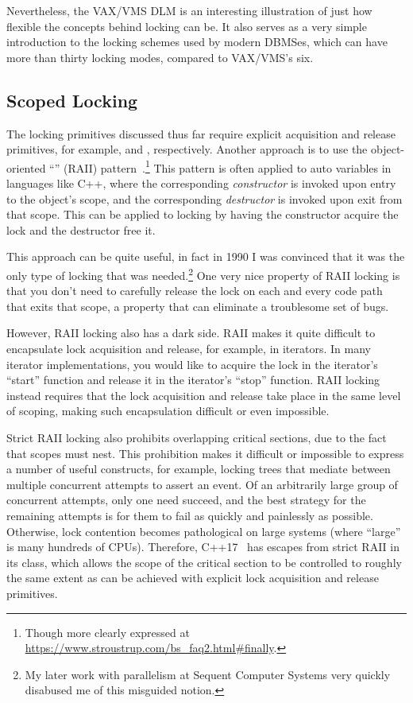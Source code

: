 Nevertheless, the VAX/VMS DLM is an interesting illustration of just
how flexible the concepts behind locking can be.
It also serves as a very simple introduction to the locking schemes
used by modern DBMSes, which can have more than thirty locking modes,
compared to VAX/VMS's six.

\subsection{Scoped Locking}
\label{sec:locking:Scoped Locking}

The locking primitives discussed thus far require explicit acquisition and
release primitives, for example,  and ,
respectively.
Another approach is to use the object-oriented ``'' (RAII)
pattern~\cite{MargaretAEllis1990Cplusplus}.\footnote{
	Though more clearly expressed at
	\url{https://www.stroustrup.com/bs_faq2.html\#finally}.}
This pattern is often applied to auto variables in languages like C++,
where the corresponding \emph{constructor} is invoked upon entry to
the object's scope, and the corresponding \emph{destructor} is invoked
upon exit from that scope.
This can be applied to locking by having the constructor acquire the
lock and the destructor free it.

This approach can be quite useful, in fact in 1990 I was convinced that it
was the only type of locking that was needed.\footnote{
	My later work with parallelism at Sequent Computer Systems very
	quickly disabused me of this misguided notion.}
One very nice property of RAII locking is that you don't need to carefully
release the lock on each and every code path that exits that scope,
a property that can eliminate a troublesome set of bugs.

However, RAII locking also has a dark side.
RAII makes it quite difficult to encapsulate lock acquisition and release,
for example, in iterators.
In many iterator implementations, you would like to acquire the lock in
the iterator's ``start'' function and release it in the iterator's ``stop''
function.
RAII locking instead requires that the lock acquisition and release take
place in the same level of scoping, making such encapsulation difficult or
even impossible.

Strict RAII locking also prohibits overlapping critical sections, due
to the fact that scopes must nest.
This prohibition makes it difficult or impossible to express a number of
useful constructs, for example, locking trees
that mediate between multiple concurrent attempts to assert an event.
Of an arbitrarily large group of concurrent attempts, only one need succeed,
and the best strategy for the remaining attempts is for them to fail as
quickly and painlessly as possible.
Otherwise, lock contention becomes pathological on large systems
(where ``large'' is many hundreds of CPUs).
Therefore, C++17~\cite{RichardSmith2019N4800} has escapes from strict RAII
in its  class, which allows the scope of the critical
section to be controlled to roughly the same extent as can be achieved
with explicit lock acquisition and release primitives.

